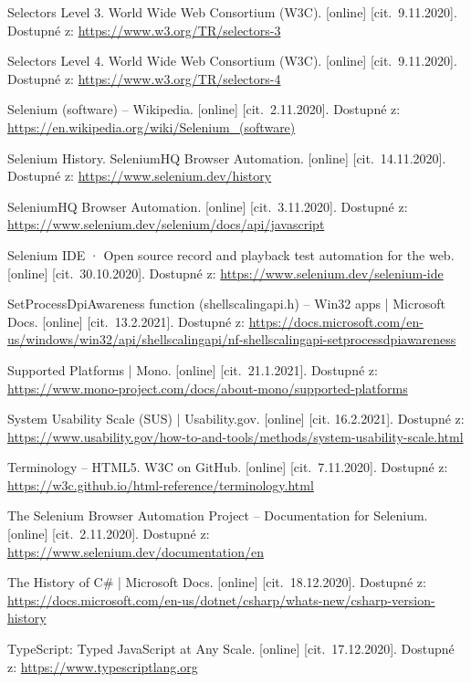 \begin{flushleft}
\begin{thebibliography}{99}
 Selectors Level 3. World Wide Web Consortium (W3C). [online] [cit.~9.11.2020]. Dostupné z: \url{https://www.w3.org/TR/selectors-3}

 Selectors Level 4. World Wide Web Consortium (W3C). [online] [cit.~9.11.2020]. Dostupné z: \url{https://www.w3.org/TR/selectors-4}

 Selenium (software) -- Wikipedia. [online] [cit.~2.11.2020]. Dostupné z: \url{https://en.wikipedia.org/wiki/Selenium_(software)}

 Selenium History. SeleniumHQ Browser Automation. [online] [cit.~14.11.2020]. Dostupné z: \url{https://www.selenium.dev/history}

 SeleniumHQ Browser Automation. [online] [cit.~3.11.2020]. Dostupné z: \url{https://www.selenium.dev/selenium/docs/api/javascript}

 Selenium IDE · Open source record and playback test automation for the web. [online] [cit.~30.10.2020]. Dostupné z: \url{https://www.selenium.dev/selenium-ide}

 SetProcessDpiAwareness function (shellscalingapi.h) -- Win32 apps | Microsoft Docs. [online] [cit.~13.2.2021]. Dostupné z: \url{https://docs.microsoft.com/en-us/windows/win32/api/shellscalingapi/nf-shellscalingapi-setprocessdpiawareness}

 Supported Platforms | Mono. [online] [cit.~21.1.2021]. Dostupné z: \url{https://www.mono-project.com/docs/about-mono/supported-platforms}

 System Usability Scale (SUS) | Usability.gov. [online] [cit. 16.2.2021]. Dostupné z: \url{https://www.usability.gov/how-to-and-tools/methods/system-usability-scale.html}

 Terminology -- HTML5. W3C on GitHub. [online] [cit.~7.11.2020]. Dostupné z: \url{https://w3c.github.io/html-reference/terminology.html}

 The Selenium Browser Automation Project -- Documentation for Selenium. [online] [cit.~2.11.2020]. Dostupné z: \url{https://www.selenium.dev/documentation/en}

 The History of C\# | Microsoft Docs. [online] [cit.~18.12.2020]. Dostupné z: \url{https://docs.microsoft.com/en-us/dotnet/csharp/whats-new/csharp-version-history}

 TypeScript: Typed JavaScript at Any Scale. [online] [cit.~17.12.2020]. Dostupné z: \url{https://www.typescriptlang.org}


\end{thebibliography}
\end{flushleft}
